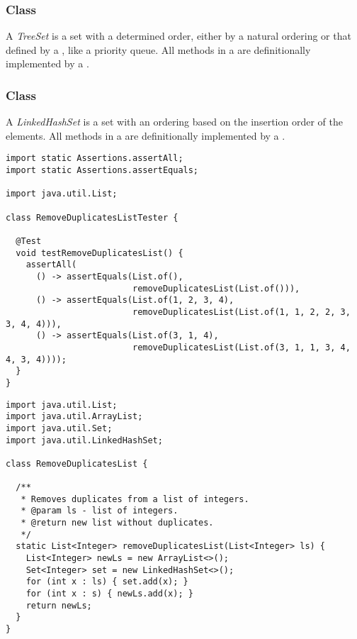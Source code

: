 \subsubsection*{ Class}
A \emph{TreeSet} is a set with a determined order, either by a natural ordering or that defined by a , like a priority queue. All methods in a  are definitionally implemented by a .

\subsubsection*{ Class}
A \emph{LinkedHashSet} is a set with an ordering based on the insertion order of the elements. All methods in a  are definitionally implemented by a .


\begin{cl}[]{}
\begin{lstlisting}[language=MyJava]
import static Assertions.assertAll;
import static Assertions.assertEquals;

import java.util.List;

class RemoveDuplicatesListTester {

  @Test
  void testRemoveDuplicatesList() {
    assertAll(
      () -> assertEquals(List.of(), 
                         removeDuplicatesList(List.of())),
      () -> assertEquals(List.of(1, 2, 3, 4), 
                         removeDuplicatesList(List.of(1, 1, 2, 2, 3, 3, 4, 4))),
      () -> assertEquals(List.of(3, 1, 4), 
                         removeDuplicatesList(List.of(3, 1, 1, 3, 4, 4, 3, 4))));
  }
}
\end{lstlisting}
\end{cl}

\begin{cl}[]{}
\begin{lstlisting}[language=MyJava]
import java.util.List;
import java.util.ArrayList;
import java.util.Set;
import java.util.LinkedHashSet;

class RemoveDuplicatesList {

  /**
   * Removes duplicates from a list of integers.
   * @param ls - list of integers.
   * @return new list without duplicates.
   */
  static List<Integer> removeDuplicatesList(List<Integer> ls) {
    List<Integer> newLs = new ArrayList<>();
    Set<Integer> set = new LinkedHashSet<>();
    for (int x : ls) { set.add(x); }
    for (int x : s) { newLs.add(x); }
    return newLs;
  }
}
\end{lstlisting}
\end{cl}

